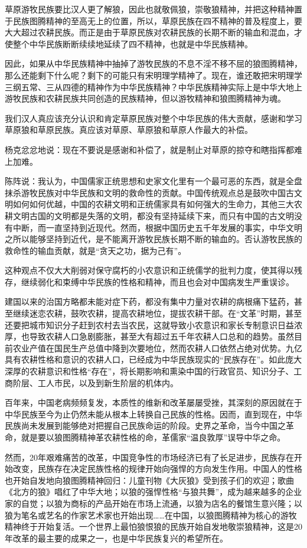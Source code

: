 \par 草原游牧民族要比汉人更了解狼，因此也就敬佩狼，崇敬狼精神，并把这种精神置于民族图腾精神的至高无上的位置，所以，草原民族在四不精神的普及程度上，要大大超过农耕民族。而正是由于草原民族对农耕民族的长期不断的输血和混血，才使整个中华民族断断续续地延续了四不精神，也就是中华民族精神。
\par 因此，如果从中华民族精神中抽掉了游牧民族的不息不淫不移不屈的狼图腾精神，那么还能剩下什么呢？剩下的可能只有宋明理学精神了。现在，谁还敢把宋明理学三纲五常、三从四德的精神作为中华民族精神？中华民族精神实际上是中华大地上游牧民族和农耕民族共同创造的民族精神，但以游牧精神和狼图腾精神为魂。
\par 我们汉人真应该充分认识和肯定草原民族对整个中华民族的伟大贡献，感谢和学习草原狼和草原民族。真应该对草原、草原狼和草原人作最大的补偿。
\par 杨克忿忿地说：现在不要说是感谢和补偿了，就是制止对草原的掠夺和瞎指挥都难上加难。
\par 陈阵说：我认为，中国儒家正统思想和史家文化里有一个最可恶的东西，就是全盘抹杀游牧民族对中华民族和文明的救命性的贡献。中国传统观点总是鼓吹中国古文明如何如何优越，中国的农耕文明和正统儒家具有如何强大的生命力，其他三大农耕文明古国的文明都是失落的文明，都没有坚持延续下来，而只有中国的古文明没有中断，而一直坚持到近现代。然而，根据中国历史五千年发展的事实，中华文明之所以能够坚持到近代，是不能离开游牧民族长期不断的输血的。否认游牧民族的救命性的输血贡献，就是“贪天之功，据为己有”。
\par 这种观点不仅大大削弱对保守腐朽的小农意识和正统儒学的批判力度，使其得以残存，继续弱化和束缚中华民族的性格和精神，而且也会对中国病发生严重误诊。
\par 建国以来的治国方略都未能对症下药，都没有集中力量对农耕的病根痛下猛药，甚至继续迷恋农耕，鼓吹农耕，提高农耕地位，提拔农耕干部。在“文革”时期，甚至还要把城市知识分子赶到农村去当农民，这就导致小农意识和家长专制意识日益浓厚，也导致农耕人口急剧膨胀，甚至大有超过五千年农耕人口总和的趋势。虽然目前农业产值在国民生产总值中降到次要地位，然而农耕人口依然占绝对优势。九亿具有农耕性格和意识的农耕人口，已经成为中华民族现实的“民族存在”。如此庞大深厚的农耕意识和性格“存在”，将长期影响和熏染中国的行政官员、知识分子、工商阶层、工人市民，以及到新生阶层的机体内。
\par 百年来，中国老病频频复发，本质性的维新和改革屡屡受挫，其深刻的原因就在于中华民族至今为止仍然未能从根本上转换自己民族的性格。因而，直到现在，中华民族尚未发展到能够绝对把握自己民族命运的阶段。史界之革命，当今中国之革命，就是要以狼图腾精神革农耕性格的命，革儒家“温良敦厚”误导中华之命。
\par 然而，20年艰难痛苦的改革，中国竞争性的市场经济已有了长足进步，民族存在开始改变，民族存在决定民族性格的规律开始向强悍的方向发生作用。中国人的性格也开始自发地向狼图腾精神回归：儿童刊物《大灰狼》受到孩子们的欢迎；歌曲《北方的狼》唱红了中华大地；以狼的强悍性格“与狼共舞”，成为越来越多的企业家的自觉；以狼为商标的产品开始在市场上流通，以狼为店名的餐馆生意兴隆；以狼为笔名或艺名的作家艺术家也开始出现……在中国，以狼图腾精神为核心的游牧精神终于开始复活。一个世界上最怕狼恨狼的民族开始自发地敬崇狼精神，这是20年改革的最主要的成果之一，也是中华民族复兴的希望所在。
